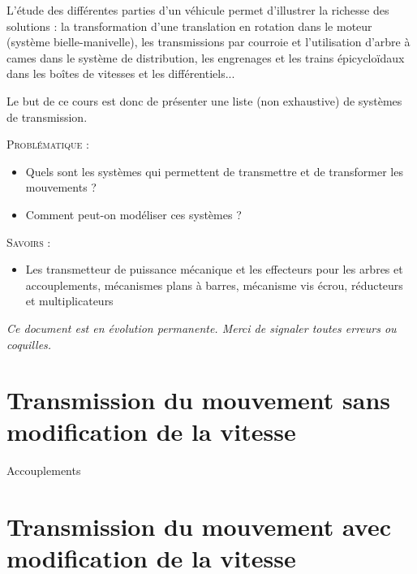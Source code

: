 \documentclass[11pt,oneside]{article}
\begin{document}
L'étude des différentes parties d'un véhicule permet d'illustrer la richesse des solutions : 
la transformation d'une translation en rotation dans le moteur (système bielle-manivelle), les transmissions par courroie et l'utilisation d'arbre à cames dans le système de distribution, les engrenages et les trains épicycloïdaux dans les boîtes de vitesses et les différentiels...

Le but de ce cours est donc de présenter une liste (non exhaustive) de systèmes de transmission.

\vspace{.2cm}



\begin{prob}
\textsc{Problématique :}
\begin{itemize}
\item Quels sont les systèmes qui permettent de transmettre et de transformer les mouvements ?
\item Comment peut-on modéliser ces systèmes ?
\end{itemize}
\end{prob}

\begin{savoir}
\textsc{Savoirs :}
\begin{itemize}
\item Les transmetteur de puissance mécanique et les effecteurs pour les arbres et accouplements, mécanismes plans à barres, mécanisme vis écrou, réducteurs et multiplicateurs
\end{itemize}
\end{savoir}

\setlength{\parskip}{0ex plus 0.2ex minus 0ex}
 \renewcommand{\contentsname}{}
 \renewcommand{\baselinestretch}{1}

\tableofcontents

 \renewcommand{\baselinestretch}{1.2}
\setlength{\parskip}{2ex plus 0.5ex minus 0.2ex}

\textit{Ce document est en évolution permanente. Merci de signaler toutes
erreurs ou coquilles.}


\section{Transmission du mouvement sans modification de la vitesse}
Accouplements




\section{Transmission du mouvement avec modification de la vitesse}
\end{document}
